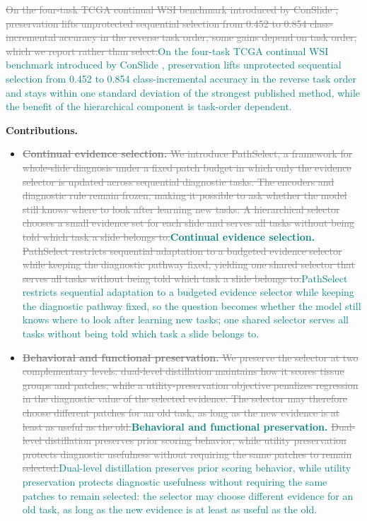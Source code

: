 \documentclass{article}
\newif\ifmarkup \markuptrue
\newcommand{\repc}[3]{\ifmarkup\textcolor{gray}{\sout{#2}}\textcolor{#1}{#3}\else#3\fi}
\newcommand{\repG}[2]{\repc{teal}{#1}{#2}}    %
\begin{document}
\repG{On the four-task TCGA continual WSI benchmark introduced by ConSlide \cite{huang2023conslide}, preservation lifts unprotected sequential selection from 0.452 to 0.854 class-incremental accuracy in the reverse task order, some gains depend on task order, which we report rather than select.}{On the four-task TCGA continual WSI benchmark introduced by ConSlide \cite{huang2023conslide}, preservation lifts unprotected sequential selection from 0.452 to 0.854 class-incremental accuracy in the reverse task order and stays within one standard deviation of the strongest published method, while the benefit of the hierarchical component is task-order dependent.}

\textbf{Contributions.}
\begin{itemize}
    \item \repG{\textbf{Continual evidence selection.} We introduce PathSelect, a framework for whole-slide diagnosis under a fixed patch budget in which only the evidence selector is updated across sequential diagnostic tasks. The encoders and diagnostic rule remain frozen, making it possible to ask whether the model still knows where to look after learning new tasks. A hierarchical selector chooses a small evidence set for each slide and serves all tasks without being told which task a slide belongs to.}{\textbf{Continual evidence selection.} \repG{PathSelect restricts sequential adaptation to a budgeted evidence selector while keeping the diagnostic pathway fixed, yielding one shared selector that serves all tasks without being told which task a slide belongs to.}{PathSelect restricts sequential adaptation to a budgeted evidence selector while keeping the diagnostic pathway fixed, so the question becomes whether the model still knows where to look after learning new tasks; one shared selector serves all tasks without being told which task a slide belongs to.}}
    \item \repG{\textbf{Behavioral and functional preservation.} We preserve the selector at two complementary levels: dual-level distillation maintains how it scores tissue groups and patches, while a utility-preservation objective penalizes regression in the diagnostic value of the selected evidence. The selector may therefore choose different patches for an old task, as long as the new evidence is at least as useful as the old.}{\textbf{Behavioral and functional preservation.} \repG{Dual-level distillation preserves prior scoring behavior, while utility preservation protects diagnostic usefulness without requiring the same patches to remain selected.}{Dual-level distillation preserves prior scoring behavior, while utility preservation protects diagnostic usefulness without requiring the same patches to remain selected: the selector may choose different evidence for an old task, as long as the new evidence is at least as useful as the old.}}

\end{itemize}
\end{document}

